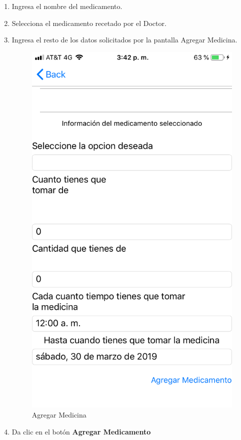 \begin{enumerate}
	\item Ingresa el nombre del medicamento.
	
	\item Selecciona el medicamento recetado por el Doctor.
	
	\item Ingresa el resto de los datos solicitados por la pantalla Agregar Medicina.
	\newpage
	\begin{figure}[!htbp]			
		\hypertarget{fig:AgregarMedicina2}{\hspace{1pt}}
		\begin{center}
			\includegraphics[height=0.4\textheight]{Paciente/AgregarMedicamento/images/AgregarMedicina2}
			\caption{Agregar Medicina}
			\label{fig:AgregarMedicina2}
		\end{center}
	\end{figure}
	
	\item Da clic en el botón \textbf{Agregar Medicamento}
	
	
\end{enumerate}

